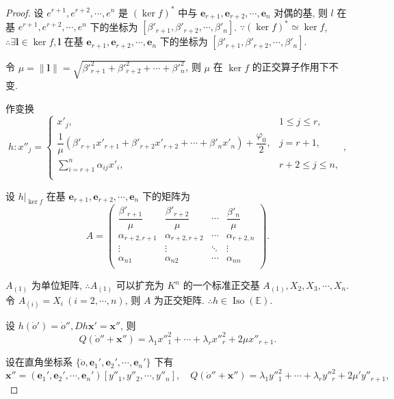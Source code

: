 \documentclass[color=black,device=normal,lang=cn,mode=geye]{elegantnote}
\begin{document}
\begin{proof}
    设 $e^{r+1},e^{r+2},\cdots,e^n$ 是 $(\ker f)^*$ 中与 $\boldsymbol{e}_{r+1},\boldsymbol{e}_{r+2},\cdots,\boldsymbol{e}_n$ 对偶的基, 则 $l$ 在基 $e^{r+1},e^{r+2},\cdots,e^n$ 下的坐标为 $[\beta'_{r+1},\beta'_{r+2},\cdots,\beta'_n]$. $\because(\ker f)^*\simeq\ker f$, $\therefore\exists\boldsymbol{l}\in\ker f,\boldsymbol{l}$ 在基 $\boldsymbol{e}_{r+1},\boldsymbol{e}_{r+2},\cdots,\boldsymbol{e}_n$ 下的坐标为 $[\beta'_{r+1},\beta'_{r+2},\cdots,\beta'_n]$.
    
    令 $\mu=\|\boldsymbol{l}\|=\sqrt{\beta'^2_{r+1}+\beta'^2_{r+2}+\cdots+\beta'^2_n}$, 则 $\mu$ 在 $\ker f$ 的正交算子作用下不变.

    作变换
    \[h:x''_j=\begin{cases}
        x'_j, & 1\leq j\leq r, \\
        \dfrac{1}{\mu}(\beta'_{r+1}x'_{r+1}+\beta'_{r+2}x'_{r+2}+\cdots+\beta'_nx'_n)+\dfrac{\varphi_0}{2}, & j=r+1, \\
        \sum\limits_{i=r+1}^n\alpha_{ij}x'_i, & r+2\leq j\leq n, \\
    \end{cases},\]

    设 $h|_{\ker f}$ 在基 $\boldsymbol{e}_{r+1},\boldsymbol{e}_{r+2},\cdots,\boldsymbol{e}_n$ 下的矩阵为
    \[A=\begin{pmatrix}
        \dfrac{\beta'_{r+1}}{\mu} & \dfrac{\beta'_{r+2}}{\mu} & \cdots & \dfrac{\beta'_n}{\mu} \\
        \alpha_{r+2,r+1} & \alpha_{r+2,r+2} & \cdots & \alpha_{r+2,n} \\
        \vdots & \vdots & \ddots & \vdots \\
        \alpha_{n1} & \alpha_{n2} & \cdots & \alpha_{nn} \\
    \end{pmatrix}.\]

    $A_{(1)}$ 为单位矩阵, $\therefore A_{(1)}$ 可以扩充为 $K^n$ 的一个标准正交基 $A_{(1)},X_2,X_3,\cdots,X_n$. 令 $A_{(i)}=X_i\ (i=2,\cdots,n)$, 则 $A$ 为正交矩阵. $\therefore h\in\operatorname{Iso}(\mathbb{E})$.

    设 $h(\dot{o}')=\dot{o}'',Dh\boldsymbol{x}'=\boldsymbol{x}''$, 则
    \[Q(\dot{o}''+\boldsymbol{x}'')=\lambda_1x''^2_1+\cdots+\lambda_rx''^2_r+2\mu x''_{r+1}.\]

    设在直角坐标系 $\{\dot{o},\boldsymbol{e}_1',\boldsymbol{e}_2',\cdots,\boldsymbol{e}_n'\}$ 下有
    \[\boldsymbol{x}''=(\boldsymbol{e}_1',\boldsymbol{e}_2',\cdots,\boldsymbol{e}_n')[y''_1,y''_2,\cdots,y''_n],\quad Q(\dot{o}''+\boldsymbol{x}'')=\lambda_1y''^2_1+\cdots+\lambda_ry''^2_r+2\mu' y''_{r+1},\]


\end{proof}
\end{document}
